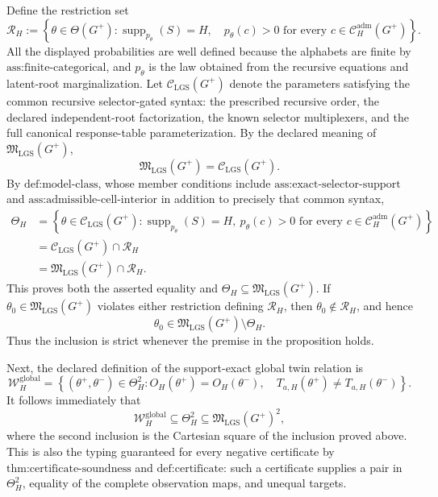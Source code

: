 Define the restriction set
\[
\mathcal R_H
:=
\left\{\theta\in\Theta(G^+):
\operatorname{supp}_{p_\theta}(S)=H,
\quad
p_\theta(c)>0\text{ for every }c\in\mathcal C_H^{\mathrm{adm}}(G^+)
\right\}.
\]
All the displayed probabilities are well defined because the alphabets are finite by \(\text{ass:finite-categorical}\), and \(p_\theta\) is the law obtained from the recursive equations and latent-root marginalization.  Let \(\mathcal C_{\mathrm{LGS}}(G^+)\) denote the parameters satisfying the common recursive selector-gated syntax: the prescribed recursive order, the declared independent-root factorization, the known selector multiplexers, and the full canonical response-table parameterization.  By the declared meaning of \(\mathfrak M_{\mathrm{LGS}}(G^+)\),
\[
\mathfrak M_{\mathrm{LGS}}(G^+)=\mathcal C_{\mathrm{LGS}}(G^+).
\]
By \(\text{def:model-class}\), whose member conditions include \(\text{ass:exact-selector-support}\) and \(\text{ass:admissible-cell-interior}\) in addition to precisely that common syntax,
\[
\begin{aligned}
\Theta_H
&=\left\{\theta\in\mathcal C_{\mathrm{LGS}}(G^+):
\operatorname{supp}_{p_\theta}(S)=H,
\ p_\theta(c)>0\text{ for every }c\in\mathcal C_H^{\mathrm{adm}}(G^+)
\right\}\\
&=\mathcal C_{\mathrm{LGS}}(G^+)\cap\mathcal R_H\\
&=\mathfrak M_{\mathrm{LGS}}(G^+)\cap\mathcal R_H.
\end{aligned}
\]
This proves both the asserted equality and \(\Theta_H\subseteq\mathfrak M_{\mathrm{LGS}}(G^+)\).  If \(\theta_0\in\mathfrak M_{\mathrm{LGS}}(G^+)\) violates either restriction defining \(\mathcal R_H\), then \(\theta_0\notin\mathcal R_H\), and hence
\[
\theta_0\in\mathfrak M_{\mathrm{LGS}}(G^+)\setminus\Theta_H.
\]
Thus the inclusion is strict whenever the premise in the proposition holds.

Next, the declared definition of the support-exact global twin relation is
\[
\mathcal W_H^{\mathrm{global}}
=
\left\{(\theta^+,\theta^-)\in\Theta_H^2:
O_H(\theta^+)=O_H(\theta^-),\quad
T_{a,H}(\theta^+)\ne T_{a,H}(\theta^-)
\right\}.
\]
It follows immediately that
\[
\mathcal W_H^{\mathrm{global}}
\subseteq \Theta_H^2
\subseteq \mathfrak M_{\mathrm{LGS}}(G^+)^2,
\]
where the second inclusion is the Cartesian square of the inclusion proved above.  This is also the typing guaranteed for every negative certificate by \(\text{thm:certificate-soundness}\) and \(\text{def:certificate}\): such a certificate supplies a pair in \(\Theta_H^2\), equality of the complete observation maps, and unequal targets.

